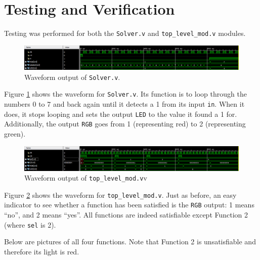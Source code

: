 \documentclass{article}
\renewcommand{\c}[1]{\texttt{#1}}
\begin{document}
\section{Testing and Verification} Testing was performed for
both the \c{Solver.v} and \c{top\_level\_mod.v} modules.

\begin{figure}[H]
    \centering
    \includegraphics[width=\textwidth]{Images/waveform_solver}
    \caption{Waveform output of \c{Solver.v}.}
    \label{waveform:solver}
\end{figure}

Figure \ref{waveform:solver} shows the waveform for \c{Solver.v}.
Its function is to loop through the numbers 0 to 7 and back
again until it detects a 1 from its input \c{in}. When it does,
it stops looping and sets the output \c{LED} to the value
it found a 1 for. Additionally, the output \c{RGB} goes from
1 (representing red) to 2 (representing green).

\begin{figure}[H]
    \centering
    \includegraphics[width=\textwidth]{Images/waveform}
    \caption{Waveform output of \c{top\_level\_mod.v}v}
    \label{waveform:toplevelmod}
\end{figure}

Figure \ref{waveform:toplevelmod} shows the waveform for
\c{top\_level\_mod.v}. Just as before, an easy indicator
to see whether a function has been satisfied is the
\c{RGB} output: 1 means ``no'', and 2 means ``yes''.
All functions are indeed satisfiable except Function 2
(where \c{sel} is 2).

Below are pictures of all four functions. Note that
Function 2 is unsatisfiable and therefore its light is red.
\end{document}
